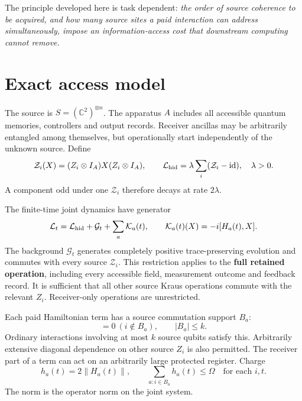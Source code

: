 \documentclass[11pt,a4paper]{article}
\newcommand{\id}{\operatorname{id}}\newcommand{\Tr}{\operatorname{Tr}}\newcommand{\Ad}{\operatorname{Ad}}
\newcommand{\norm}[1]{\left\lVert #1\right\rVert}
\newcommand{\calK}{\mathcal K}\newcommand{\calP}{\mathcal P}\newcommand{\calZ}{\mathcal Z}\newcommand{\calG}{\mathcal G}
\begin{document}
The principle developed here is task dependent: \emph{the order of source coherence to be acquired, and how many source sites a paid interaction can address simultaneously, impose an information-access cost that downstream computing cannot remove.}

\section{Exact access model}
\label{sec:model}

The source is $S=(\mathbb C^2)^{\otimes n}$. The apparatus $A$ includes all accessible quantum memories, controllers and output records. Receiver ancillas may be arbitrarily entangled among themselves, but operationally start independently of the unknown source. Define
\begin{equation}
\calZ_i(X)=(Z_i\otimes I_A)X(Z_i\otimes I_A),\qquad
\mathcal L_{\rm hid}=\lambda\sum_i(\calZ_i-\id),\quad\lambda>0.
\end{equation}
A component odd under one $\calZ_i$ therefore decays at rate $2\lambda$.

The finite-time joint dynamics have generator
\begin{equation}
\mathcal L_t=\mathcal L_{\rm hid}+\calG_t+\sum_a\calK_a(t),\qquad
\calK_a(t)(X)=-i[H_a(t),X].
\end{equation}
The background $\calG_t$ generates completely positive trace-preserving evolution and commutes with every source $\calZ_i$. This restriction applies to the \textbf{full retained operation}, including every accessible field, measurement outcome and feedback record. It is sufficient that all other source Kraus operations commute with the relevant $Z_i$. Receiver-only operations are unrestricted.

Each paid Hamiltonian term has a source commutation support $B_a$:
\begin{equation}
[H_a(t),Z_i\otimes I_A]=0\ (i\notin B_a),\qquad |B_a|\le k.
\end{equation}
Ordinary interactions involving at most $k$ source qubits satisfy this. Arbitrarily extensive diagonal dependence on other source $Z_i$ is also permitted. The receiver part of a term can act on an arbitrarily large protected register. Charge
\begin{equation}
h_a(t)=2\norm{H_a(t)},\qquad
\sum_{a:i\in B_a}h_a(t)\le\Omega\quad\text{for each }i,t.
\label{eq:budget}
\end{equation}
The norm is the operator norm on the joint system.
\end{document}
